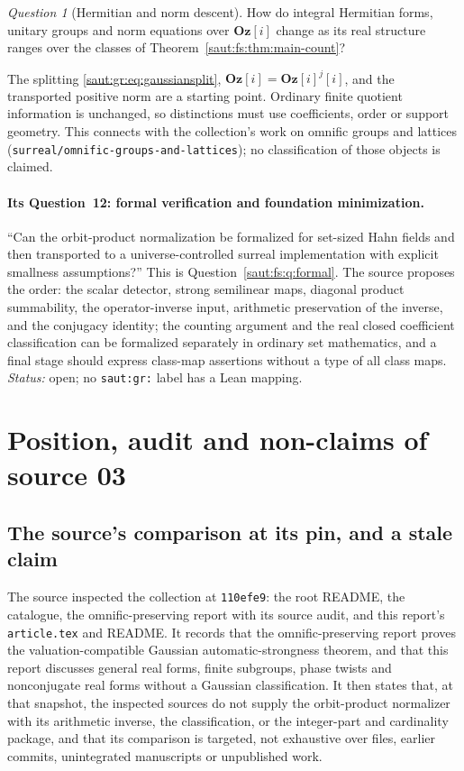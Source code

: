 \documentclass[11pt]{article}
\theoremstyle{definition}
\theoremstyle{remark}
\newtheorem{question}[theorem]{Question}
\newcommand{\repo}[1]{\nolinkurl{#1}}%
\newcommand{\Oz}{\mathbf{Oz}}
\numberwithin{equation}{section}
\begin{document}
\begin{question}[Hermitian and norm descent]\label{saut:gr:q:hermitian}
How do integral Hermitian forms, unitary groups and norm equations over $\Oz[i]$ change
as its real structure ranges over the classes of Theorem~\ref{saut:fs:thm:main-count}?
\end{question}
The splitting \eqref{saut:gr:eq:gaussiansplit}, $\Oz[i]=\Oz[i]^j[i]$, and the transported
positive norm are a starting point. Ordinary finite quotient information is unchanged, so
distinctions must use coefficients, order or support geometry. This connects with the
collection's work on omnific groups and lattices
(\repo{surreal/omnific-groups-and-lattices}); no classification of those objects is
claimed.

\paragraph{Its Question~12: formal verification and foundation minimization.} ``Can the
orbit-product normalization be formalized for set-sized Hahn fields and then transported to
a universe-controlled surreal implementation with explicit smallness assumptions?'' This
is Question~\ref{saut:fs:q:formal}. The source proposes the order: the scalar detector,
strong semilinear maps, diagonal product summability, the operator-inverse input,
arithmetic preservation of the inverse, and the conjugacy identity; the counting argument
and the real closed coefficient classification can be formalized separately in ordinary
set mathematics, and a final stage should express class-map assertions without a type of
all class maps. \emph{Status:} open; no \texttt{saut:gr:} label has a Lean mapping.

\section{Position, audit and non-claims of source 03}\label{saut:gr:sec:closing}

\subsection{The source's comparison at its pin, and a stale claim}\label{saut:gr:sec:position}

The source inspected the collection at \texttt{110efe9}: the root README, the catalogue,
the omnific-preserving report with its source audit, and this report's
\texttt{article.tex} and README. It records that the omnific-preserving report proves
the valuation-compatible Gaussian automatic-strongness theorem, and that this report
discusses general real forms, finite subgroups, phase twists and nonconjugate real forms
without a Gaussian classification. It then states that, at that snapshot, the inspected
sources do not supply the orbit-product normalizer with its arithmetic inverse, the
classification, or the integer-part and cardinality package, and that its comparison is
targeted, not exhaustive over files, earlier commits, unintegrated manuscripts or
unpublished work.
\end{document}
